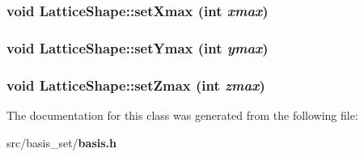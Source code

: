 \subsubsection{\setlength{\rightskip}{0pt plus 5cm}void Lattice\-Shape::set\-Xmax (int {\em xmax})\hspace{0.3cm}{\tt  [inline]}}\label{classLatticeShape_9ef88f445fc2058302d80f7d4c91c846}


\subsubsection{\setlength{\rightskip}{0pt plus 5cm}void Lattice\-Shape::set\-Ymax (int {\em ymax})\hspace{0.3cm}{\tt  [inline]}}\label{classLatticeShape_4255ab2e014ab0ecd555ddd59273674d}


\subsubsection{\setlength{\rightskip}{0pt plus 5cm}void Lattice\-Shape::set\-Zmax (int {\em zmax})\hspace{0.3cm}{\tt  [inline]}}\label{classLatticeShape_25067e6366b3c7f69b22ebcb001667db}




The documentation for this class was generated from the following file:\begin{CompactItemize}
\item 
src/basis\_\-set/\bf{basis.h}\end{CompactItemize}
